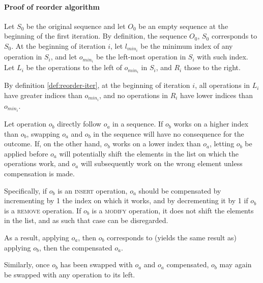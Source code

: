 \paragraph {Proof of reorder algorithm}
\begin{definition}
\label{def:reorder-iter}

Let $S_0$ be the original sequence and let $O_0$ be an empty sequence at the
beginning of the first iteration. By definition, the sequence $O_0$, $S_0$
corresponds to $S_0$. At the beginning of iteration $i$, let $l_{min_i}$ be the
minimum index of any operation in $S_i$, and let $o_{min_i}$ be the left-most
operation in $S_i$ with such index. Let $L_i$ be the operations to the left of
$o_{min_i}$ in $S_i$, and $R_i$ those to the right.

\end{definition}

\begin{lemma}
\label{lem:reorder-inequality}

By definition \ref{def:reorder-iter}, at the beginning of iteration $i$, all
operations in $L_i$ have greater indices than $o_{min_i}$, and no operations in
$R_i$ have lower indices than $o_{min_i}$.

\end{lemma}

\begin{theorem}
\label{theorem:reorder-swap}

Let operation $o_b$ directly follow $o_a$ in a sequence. If $o_b$ works on a
higher index than $o_b$, swapping $o_a$ and $o_b$ in the sequence will have no
consequence for the outcome. If, on the other hand, $o_b$ works on a lower index
than $o_a$, letting $o_b$ be applied before $o_a$ will potentially shift the
elements in the list on which the operations work, and $o_a$ will subsequently
work on the wrong element unless compensation is made.

Specifically, if $o_b$ is an \textsc{insert} operation, $o_a$ should be
compensated by incrementing by 1 the index on which it works, and by
decrementing it by 1 if $o_b$ is a \textsc{remove} operation. If $o_b$ is a
\textsc{modify} operation, it does not shift the elements in the list, and as
such that case can be disregarded.

As a result, applying $o_a$, then $o_b$ corresponds to (yields the same result
as) applying $o_b$, then the compensated $o_a$.

Similarly, once $o_b$ has been swapped with $o_a$ and $o_a$ compensated, $o_b$
may again be swapped with any operation to its left.

\end{theorem}

